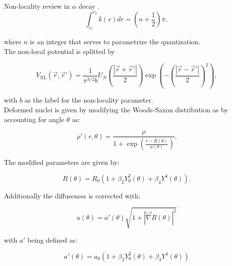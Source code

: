 \documentclass[openany]{book}
\begin{document}
Non-locality review in $\alpha$ decay \cite{rojas-gamboa_velasquez_kelkar_upadhyay_2022}. \\

\begin{equation}\label{potential_nonLocal_WKB_quantization}
	\int_{r_1}^{r_2} {k(r) dr} = \left (n + \frac{1}{2} \right )\pi,
\end{equation}

where $n$ is an integer that serves to parametrize the quantization. \\

The non-local potential is splitted by 

\begin{equation}\label{potential_nonLocal_gaussian}
	V_{\mathrm{NL}} (\vec r, \vec r') = \frac{1}{\pi^{3/2}b} U_N \left( \frac{|\vec r + \vec r'|}{2}\right) \exp \left(- \left( \frac{|\vec r - \vec r'|}{2}\right)^2\right),
\end{equation}

with $b$ as the label for the non-locality parameter.\\

Deformed nuclei is given by modifying the Woods-Saxon distribution as by accounting for angle $\theta$ as:


 \begin{equation}\label{potential_nonLocal_modifiedWoodsSaxon}
 	\rho'(r, \theta) = \frac{\rho }{1+\exp{\left(\frac{r-R(\theta)}{a(\theta)}\right)}}.
 \end{equation}
 
The modified parameters are given by:

 \begin{equation}\label{potential_nonLocal_modifiedWoodsSaxon_r}
	R(\theta) = R_0(1 + \beta_2 Y^{2}_{0}(\theta) + \beta_4Y^{4}(\theta)).
\end{equation}

Additionally the diffuseness is corrected with:

 \begin{equation}\label{potential_nonLocal_modifiedWoodsSaxon_a}
	a(\theta) = a'(\theta) \sqrt{1 + |\vec \nabla R(\theta)|^2 }
\end{equation}

with $a'$ being defined as:

 \begin{equation}\label{potential_nonLocal_modifiedWoodsSaxon_aprime}
	a'(\theta) = a_0 \left(1 + \beta_2 Y^{2}_{0}(\theta) + \beta_4Y^{4}(\theta)\right)
\end{equation}
\end{document}
